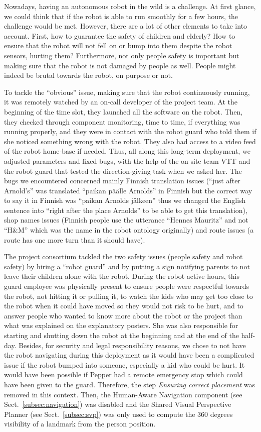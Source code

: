 \documentclass[a4paper,11pt,twoside]{StyleThese}
\begin{document}
Nowadays, having an autonomous robot in the wild is a challenge. At first glance, we could think that if the robot is able to run smoothly for a few hours, the challenge would be met. However, there are a lot of other elements to take into account. First, how to guarantee the safety of children and elderly? How to ensure that the robot will not fell on or bump into them despite the robot sensors, hurting them? Furthermore, not only people safety is important but making sure that the robot is not damaged by people as well. People might indeed be brutal towards the robot, on purpose or not. 

To tackle the ``obvious'' issue, making sure that the robot continuously running, it was remotely watched by an on-call developer of the project team. At the beginning of the time slot, they launched all the software on the robot. Then, they checked through component monitoring, time to time, if everything was running properly, and they were in contact with the robot guard who told them if she noticed something wrong with the robot. They also had access to a video feed of the robot home-base if needed. Thus, all along this long-term deployment, we adjusted parameters and fixed bugs, with the help of the on-site team VTT and the robot guard that tested the direction-giving task when we asked her. The bugs we encountered concerned mainly Finnish translation issues (\eg ``just after Arnold's'' was translated ``paikan päälle Arnolds'' in Finnish but the correct way to say it in Finnish was ``paikan Arnolds jälkeen'' thus we changed the English sentence into ``right after the place Arnolds'' to be able to get this translation), shop names issues (\eg Finnish people use the utterance ``Hennes Mauritz'' and not ``H\&M'' which was the name in the robot ontology originally) and route issues (\eg a route has one more turn than it should have).

The project consortium tackled the two safety issues (people safety and robot safety) by hiring a ``robot guard'' and by putting a sign notifying parents to not leave their children alone with the robot. During the robot active hours, this guard employee was physically present to ensure people were respectful towards the robot, \ie not hitting it or pulling it, to watch the kids who may get too close to the robot when it could have moved so they would not risk to be hurt, and to answer people who wanted to know more about the robot or the project than what was explained on the explanatory posters. She was also responsible for starting and shutting down the robot at the beginning and at the end of the half-day. Besides, for security and legal responsibility reasons, we chose to not have the robot navigating during this deployment as it would have been a complicated issue if the robot bumped into someone, especially a kid who could be hurt. It would have been possible if Pepper had a remote emergency stop which could have been given to the guard. Therefore, the step \emph{Ensuring correct placement} was removed in this context. Then, the Human-Aware Navigation component (see Sect.~\ref{subsec:navigation}) was disabled and the Shared Visual Perspective Planner (see Sect.~\ref{subsec:svp}) was only used to compute the 360 degrees visibility of a landmark from the person position.
\end{document}
